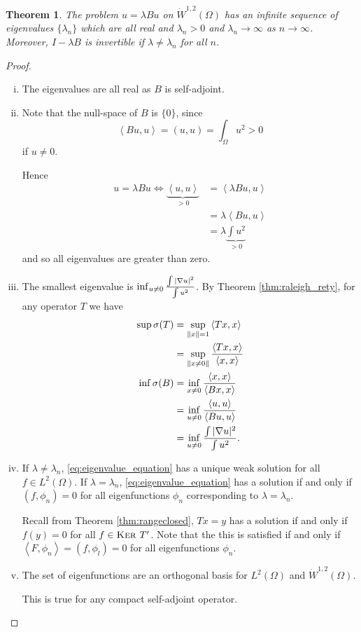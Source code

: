 \documentclass[10pt, oneside, reqno]{amsart}
\theoremstyle{plain}%
\newtheorem{thm}{Theorem}[section]
\numberwithin{equation}{section}
\theoremstyle{definition}
\theoremstyle{remark}
\renewcommand{\ker}{\textsc{Ker\ }}
\newcommand{\iprod}[1]{\left\langle #1 \right\rangle}
\begin{document}
\begin{thm}
	The problem $u = \lambda B u $ on $\dot W^{1, 2}(\Omega)$ has an infinite sequence of eigenvalues $\{ \lambda_n \}$ which are all real and $\lambda_n > 0$ and $\lambda_n \rightarrow \infty$ as $n \rightarrow \infty$.  Moreover, $I- \lambda B$ is invertible if $\lambda \neq \lambda_n$ for all $n$.
\end{thm}
\begin{proof}{\ }
	
\begin{enumerate}[(i)]
	\item The eigenvalues are all real as $B$ is self-adjoint.
	\item
	Note that the null-space of $B$ is $\{ 0 \}$, since \[
		\iprod{Bu, u} = (u, u) = \int_\Omega u^2 > 0
	\] if $u \neq 0$.  
	
	Hence \begin{align*}
		u = \lambda Bu \iff \underbrace{\iprod{u, u}}_{> 0} &= \iprod{\lambda Bu, u} \\
										&= \lambda \iprod{Bu, u} \\
										&= \lambda \underbrace{\int u^2}_{> 0}
	\end{align*} and so all eigenvalues are greater than zero.
	
	\item 
		The smallest eigenvalue is $\inf_{u \neq 0} \frac {\int |\nabla u |^2}{\int u^2}$. By Theorem \ref{thm:raleigh_rety}, for any operator $T$ we have \begin{align*}
			\sup \sigma(T) 	&= \sup_{\| x \| = 1} \iprod{Tx, x} \\
							&= \sup_{\| x \neq 0 \|} \frac{\iprod{Tx, x}}{\iprod{x, x}} \\
							\inf \sigma(B) &= \inf_{x \neq 0} \frac{\iprod{x, x}}{\iprod{Bx, x}} \\
							&= \inf_{u \neq 0} \frac{\iprod{u, u}}{\iprod{Bu, u}}  \\
							&= \inf_{u \neq 0} \frac{\int |\grad u |^2}{\int u^2}.
		\end{align*} 
	\item If $\lambda \neq \lambda_n$, \eqref{eq:eigenvalue_equation} has a unique weak solution for all $f \in L^2(\Omega)$.  If $\lambda = \lambda_n$, \eqref{eq:eigenvalue_equation} has a solution if and only if $(f, \phi_n) = 0$ for all eigenfunctions $\phi_n$ corresponding to $\lambda = \lambda_n$.
	
	Recall from Theorem \ref{thm:rangeclosed}, $Tx = y$ has a solution if and only if $f(y) = 0$ for all $f \in \ker T'$.  Note that the this is satisfied if and only if $\iprod{F, \phi_n} = (f, \phi_l) = 0$ for all eigenfunctions $\phi_n$.
	\item The set of eigenfunctions are an orthogonal basis for $L^2(\Omega)$ and $\dot W^{1, 2}(\Omega)$.
	
	This is true for any compact self-adjoint operator.
	
	\qedhere
\end{enumerate}
\end{proof}
\end{document}
